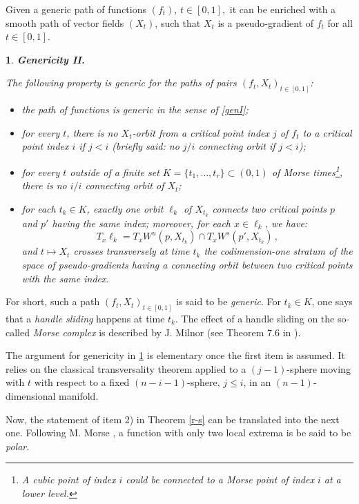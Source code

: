 \documentclass[12pt]{amsart}
\newtheorem{rien}[thm]{}
\begin{document}
Given a generic path of functions $\left( f_t\right),\, t\in [0,1],$ it can be enriched with a smooth path of vector fields $\left (X_t\right)$, such that $X_t$ is  a pseudo-gradient of $f_t$ for all $t\in [0,1]$.



\begin{rien}{\bf Genericity II.} \label{genII}{\rm The following property is generic  for the paths of pairs
$\left(f_t,X_t\right)_{t\in [0,1]}$:
\begin{itemize}
\item the path of functions is generic in the sense of \ref{genI};
\item for every $t$,  there is no $X_t$-orbit from a critical point index $j$ of $f_t$ to a critical point
 index $i$ if $j<i$ (briefly said: no $j/i$ {\it connecting orbit}  if $j<i$);
 \item for every $t$ outside of a finite set $K=\{t_1,\ldots,t_r\}\subset(0,1)$ of Morse times\footnote{A cubic
  point of index $i$ could be connected to a Morse point of index $i$ at a lower level.},
  there is no $i/i$
 connecting orbit of $X_t$;
 \item for each $t_k\in K$, exactly one orbit $\ell_k$ of $X_{t_k}$
 connects two critical points $p$ and $p'$ %
 having the same index; moreover, for each $x\in \ell_k$, we have:
$$T_x\ell_k=T_xW^u(p,X_{t_k}) \cap T_xW^s(p',X_{t_k})\, ,$$
and $t\mapsto X_t$ crosses transversely  at time $t_k$ the codimension-one stratum
 of the space of pseudo-gradients having a connecting orbit between two critical points with the same index.
\end{itemize} }
\end{rien}
For short, such a   path $\left(f_t,X_t\right)_{t\in [0,1]}$ is said to be {\it generic}. 
For $t_k\in K$,
one says that a {\it handle sliding} happens at time $t_k$. The effect of 
a handle sliding  on the so-called 
{\it Morse complex} is described by  J. Milnor
(see Theorem 7.6 in \cite{h-cob}). 

The argument for genericity  in \ref{genII} is elementary once the first item is assumed. It  relies on the classical  transversality theorem
applied to a  $(j-1)$-sphere moving with $t$ with respect 
to a fixed $(n-i-1)$-sphere,  $j\leq i$, in an $(n-1)$-dimensional manifold.

Now, the statement of item 2) in Theorem \ref{r-s} can be  translated into the next one. Following
  M. Morse  \cite{morse},   a function with only two local extrema is be
  said to be {\it polar}.
\end{document}
